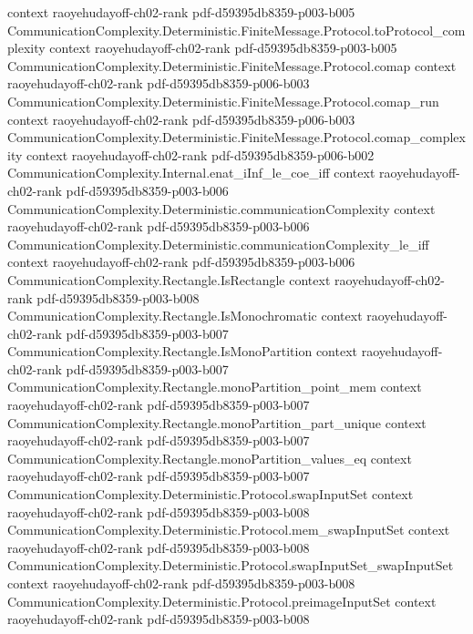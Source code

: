 \begin{theorem}
  {context}
  {raoyehudayoff-ch02-rank}
  {pdf-d59395db8359-p003-b005}
\proofstep
  {CommunicationComplexity.Deterministic.FiniteMessage.Protocol.toProtocol_complexity}
  {context}
  {raoyehudayoff-ch02-rank}
  {pdf-d59395db8359-p003-b005}
\proofstep
  {CommunicationComplexity.Deterministic.FiniteMessage.Protocol.comap}
  {context}
  {raoyehudayoff-ch02-rank}
  {pdf-d59395db8359-p006-b003}
\proofstep
  {CommunicationComplexity.Deterministic.FiniteMessage.Protocol.comap_run}
  {context}
  {raoyehudayoff-ch02-rank}
  {pdf-d59395db8359-p006-b003}
\proofstep
  {CommunicationComplexity.Deterministic.FiniteMessage.Protocol.comap_complexity}
  {context}
  {raoyehudayoff-ch02-rank}
  {pdf-d59395db8359-p006-b002}
\proofstep
  {CommunicationComplexity.Internal.enat_iInf_le_coe_iff}
  {context}
  {raoyehudayoff-ch02-rank}
  {pdf-d59395db8359-p003-b006}
\proofstep
  {CommunicationComplexity.Deterministic.communicationComplexity}
  {context}
  {raoyehudayoff-ch02-rank}
  {pdf-d59395db8359-p003-b006}
\proofstep
  {CommunicationComplexity.Deterministic.communicationComplexity_le_iff}
  {context}
  {raoyehudayoff-ch02-rank}
  {pdf-d59395db8359-p003-b006}
\proofstep
  {CommunicationComplexity.Rectangle.IsRectangle}
  {context}
  {raoyehudayoff-ch02-rank}
  {pdf-d59395db8359-p003-b008}
\proofstep
  {CommunicationComplexity.Rectangle.IsMonochromatic}
  {context}
  {raoyehudayoff-ch02-rank}
  {pdf-d59395db8359-p003-b007}
\proofstep
  {CommunicationComplexity.Rectangle.IsMonoPartition}
  {context}
  {raoyehudayoff-ch02-rank}
  {pdf-d59395db8359-p003-b007}
\proofstep
  {CommunicationComplexity.Rectangle.monoPartition_point_mem}
  {context}
  {raoyehudayoff-ch02-rank}
  {pdf-d59395db8359-p003-b007}
\proofstep
  {CommunicationComplexity.Rectangle.monoPartition_part_unique}
  {context}
  {raoyehudayoff-ch02-rank}
  {pdf-d59395db8359-p003-b007}
\proofstep
  {CommunicationComplexity.Rectangle.monoPartition_values_eq}
  {context}
  {raoyehudayoff-ch02-rank}
  {pdf-d59395db8359-p003-b007}
\proofstep
  {CommunicationComplexity.Deterministic.Protocol.swapInputSet}
  {context}
  {raoyehudayoff-ch02-rank}
  {pdf-d59395db8359-p003-b008}
\proofstep
  {CommunicationComplexity.Deterministic.Protocol.mem_swapInputSet}
  {context}
  {raoyehudayoff-ch02-rank}
  {pdf-d59395db8359-p003-b008}
\proofstep
  {CommunicationComplexity.Deterministic.Protocol.swapInputSet_swapInputSet}
  {context}
  {raoyehudayoff-ch02-rank}
  {pdf-d59395db8359-p003-b008}
\proofstep
  {CommunicationComplexity.Deterministic.Protocol.preimageInputSet}
  {context}
  {raoyehudayoff-ch02-rank}
  {pdf-d59395db8359-p003-b008}

\end{theorem}
